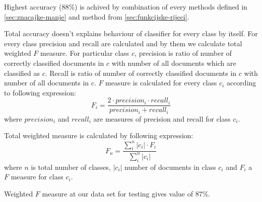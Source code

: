 \documentclass[11pt,english]{article}
\begin{document}
\begin{multicols}{2}
Highest accuracy (88\%) is achived by combination of every methods defined in
\ref{sec:znacajke-manje} and method from \ref{sec:funkcijske-rijeci}.

Total accuracy doesn't explains behaviour of classifier for every class by
itself. For every class precision and recall are calculated and by them we
calculate total weighted $F$ measure. For particular class $c$, precision is
ratio of number of correctly classified documents in $c$ with number of all
documents which are classified as $c$. Recall is ratio of number of correctly
classified documents in $c$ with number of all documents in $c$. $F$ measure is
calculated for every class $c_i$ according to following expression:
\begin{equation}
F_i = \frac{2 \cdot precision_i \cdot recall_i}{precision_i + recall_i}
\end{equation}
where $precision_i$ and $recall_i$ are measures of precision and recall for
class $c_i$.

Total weighted measure is calculated by following expression:
\begin{equation}
F_u = \frac{\sum^{n}_i |c_i|\cdot F_i}{\sum^n_i|c_i|}
\end{equation}
where $n$ is total number of classes, $|c_i|$ number of documents in class
$c_i$ and $F_i$ a $F$ measure for class $c_i$.

Weighted $F$ measure at our data set for testing gives value of 87\%.



\end{multicols}
\end{document}
